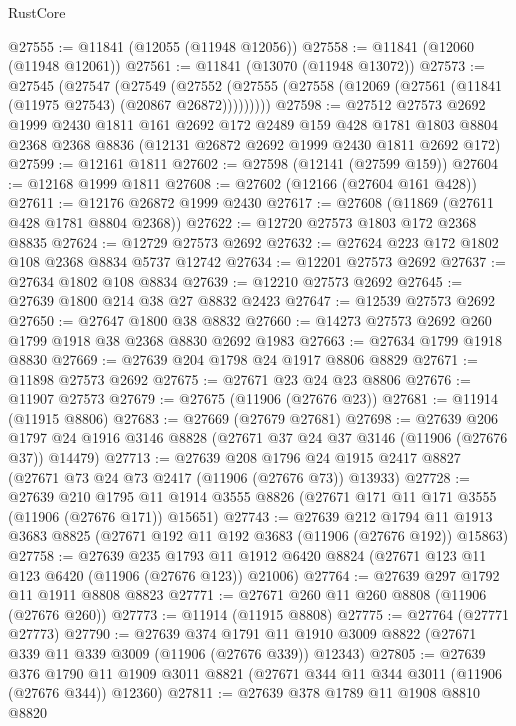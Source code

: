\begin{lexlean}{RustCore}
\begin{coremodule}
@27555 := @11841 (@12055 (@11948 @12056))
@27558 := @11841 (@12060 (@11948 @12061))
@27561 := @11841 (@13070 (@11948 @13072))
@27573 := @27545
    (@27547
      (@27549
        (@27552 (@27555 (@27558 (@12069 (@27561 (@11841 (@11975 @27543) (@20867 @26872)))))))))
@27598 := @27512
    @27573
    @2692
    @1999
    @2430
    @1811
    @161
    @2692
    @172
    @2489
    @159
    @428
    @1781
    @1803
    @8804
    @2368
    @2368
    @8836
    (@12131 @26872 @2692 @1999 @2430 @1811 @2692 @172)
@27599 := @12161 @1811
@27602 := @27598 (@12141 (@27599 @159))
@27604 := @12168 @1999 @1811
@27608 := @27602 (@12166 (@27604 @161 @428))
@27611 := @12176 @26872 @1999 @2430
@27617 := @27608 (@11869 (@27611 @428 @1781 @8804 @2368))
@27622 := @12720 @27573 @1803 @172 @2368 @8835
@27624 := @12729 @27573 @2692
@27632 := @27624 @223 @172 @1802 @108 @2368 @8834 @5737 @12742
@27634 := @12201 @27573 @2692
@27637 := @27634 @1802 @108 @8834
@27639 := @12210 @27573 @2692
@27645 := @27639 @1800 @214 @38 @27 @8832 @2423
@27647 := @12539 @27573 @2692
@27650 := @27647 @1800 @38 @8832
@27660 := @14273 @27573 @2692 @260 @1799 @1918 @38 @2368 @8830 @2692 @1983
@27663 := @27634 @1799 @1918 @8830
@27669 := @27639 @204 @1798 @24 @1917 @8806 @8829
@27671 := @11898 @27573 @2692
@27675 := @27671 @23 @24 @23 @8806
@27676 := @11907 @27573
@27679 := @27675 (@11906 (@27676 @23))
@27681 := @11914 (@11915 @8806)
@27683 := @27669 (@27679 @27681)
@27698 := @27639
    @206
    @1797
    @24
    @1916
    @3146
    @8828
    (@27671 @37 @24 @37 @3146 (@11906 (@27676 @37)) @14479)
@27713 := @27639
    @208
    @1796
    @24
    @1915
    @2417
    @8827
    (@27671 @73 @24 @73 @2417 (@11906 (@27676 @73)) @13933)
@27728 := @27639
    @210
    @1795
    @11
    @1914
    @3555
    @8826
    (@27671 @171 @11 @171 @3555 (@11906 (@27676 @171)) @15651)
@27743 := @27639
    @212
    @1794
    @11
    @1913
    @3683
    @8825
    (@27671 @192 @11 @192 @3683 (@11906 (@27676 @192)) @15863)
@27758 := @27639
    @235
    @1793
    @11
    @1912
    @6420
    @8824
    (@27671 @123 @11 @123 @6420 (@11906 (@27676 @123)) @21006)
@27764 := @27639 @297 @1792 @11 @1911 @8808 @8823
@27771 := @27671 @260 @11 @260 @8808 (@11906 (@27676 @260))
@27773 := @11914 (@11915 @8808)
@27775 := @27764 (@27771 @27773)
@27790 := @27639
    @374
    @1791
    @11
    @1910
    @3009
    @8822
    (@27671 @339 @11 @339 @3009 (@11906 (@27676 @339)) @12343)
@27805 := @27639
    @376
    @1790
    @11
    @1909
    @3011
    @8821
    (@27671 @344 @11 @344 @3011 (@11906 (@27676 @344)) @12360)
@27811 := @27639 @378 @1789 @11 @1908 @8810 @8820

\end{coremodule}
\end{lexlean}

